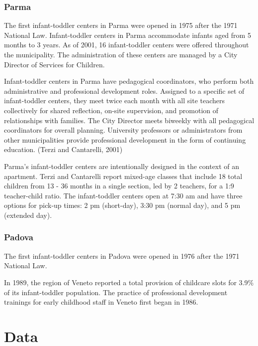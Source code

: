 \subsubsection{Parma}
The first infant-toddler centers in Parma were opened in 1975 after the 1971 National Law. Infant-toddler centers in Parma accommodate infants aged from 5 months to 3 years. As of 2001, 16 infant-toddler centers were offered throughout the municipality. The administration of these centers are managed by a City Director of Services for Children. 

Infant-toddler centers in Parma have pedagogical coordinators, who perform both administrative and professional development roles. Assigned to a specific set of infant-toddler centers, they meet twice each month with all site teachers collectively for shared reflection, on-site supervision, and promotion of relationships with families. The City Director meets biweekly with all pedagogical coordinators for overall planning. University professors or administrators from other municipalities provide professional development in the form of continuing education. (Terzi and Cantarelli, 2001)

Parma's infant-toddler centers are intentionally designed in the context of an apartment. Terzi and Cantarelli report mixed-age classes that include 18 total children from 13 - 36 months in a single section, led by 2 teachers, for a 1:9 teacher-child ratio. The infant-toddler centers open at 7:30 am and have three options for pick-up times: 2 pm (short-day), 3:30 pm (normal day), and 5 pm (extended day).


\subsubsection{Padova}
The first infant-toddler centers in Padova were opened in 1976 after the 1971 National Law. 

In 1989, the region of Veneto reported a total provision of childcare slots for 3.9\% of its infant-toddler population. The practice of professional development trainings for early childhood staff in Veneto first began in 1986.



\section{Data}

